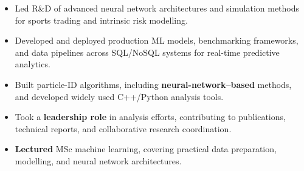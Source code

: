 \documentclass[11 pt,oneside,a4paper,titlepage]{article}
\begin{document}
                  \small{
                    \begin{itemize}

                    \item Led R&D of advanced neural network architectures and simulation methods for sports trading and intrinsic risk modelling.
                    \item Developed and deployed production ML models, benchmarking frameworks, and data pipelines across SQL/NoSQL systems for real-time predictive analytics.

  
                    \end{itemize}
                  }
        \vspace*{0.22cm}                        
          \small{
          \begin{itemize}
          \item Built particle-ID algorithms, including \textbf{neural-network–based} methods, and developed widely used C++/Python analysis tools.
          \item Took a \textbf{leadership role} in analysis efforts, contributing to publications, technical reports, and collaborative research coordination.
          \item \textbf{Lectured} MSc machine learning, covering practical data preparation, modelling, and neural network architectures.
            
          \end{itemize}
        }
        \vspace*{0.22cm}                        
  
\end{document}
